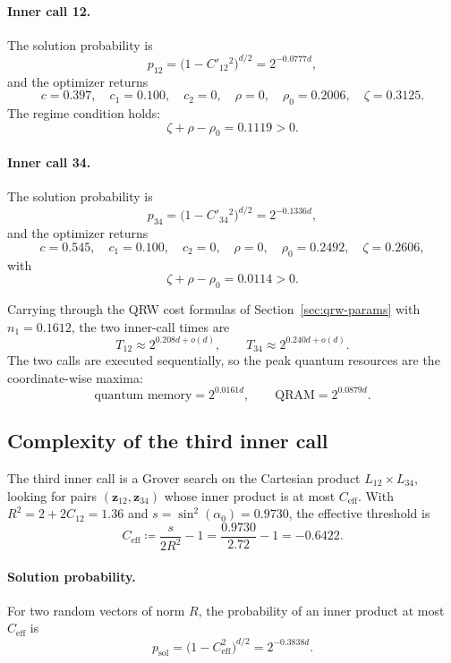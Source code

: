 \documentclass[10pt,a4paper]{article}
\begin{document}
\paragraph{Inner call 12.}
The solution probability is
\[
p_{12} = \bigl(1-C'_{12}{}^2\bigr)^{d/2} = 2^{-0.0777d},
\]
and the optimizer returns
\begin{equation}
c = 0.397,\quad c_1 = 0.100,\quad c_2 = 0,\quad \rho = 0,
\quad \rho_0 = 0.2006,\quad \zeta = 0.3125.
\end{equation}
The regime condition holds:
\[
\zeta + \rho - \rho_0 = 0.1119 > 0.
\]

\paragraph{Inner call 34.}
The solution probability is
\[
p_{34} = \bigl(1-C'_{34}{}^2\bigr)^{d/2} = 2^{-0.1336d},
\]
and the optimizer returns
\begin{equation}
c = 0.545,\quad c_1 = 0.100,\quad c_2 = 0,\quad \rho = 0,
\quad \rho_0 = 0.2492,\quad \zeta = 0.2606,
\end{equation}
with
\[
\zeta + \rho - \rho_0 = 0.0114 > 0.
\]

Carrying through the QRW cost formulas of Section~\ref{sec:qrw-params} with \(n_1 = 0.1612\), the two inner-call times are
\[
T_{12} \approx 2^{0.208d+o(d)},\qquad T_{34} \approx 2^{0.240d+o(d)}.
\]
The two calls are executed sequentially, so the peak quantum resources are the coordinate-wise maxima:
\[
\text{quantum memory} = 2^{0.0161d},\qquad
\text{QRAM} = 2^{0.0879d}.
\]

\subsection{Complexity of the third inner call}
\label{sec:third-call}

The third inner call is a Grover search on the Cartesian product
\(L_{12}\times L_{34}\), looking for pairs
\((\mathbf{z}_{12},\mathbf{z}_{34})\) whose inner product is at most
\(C_{\mathrm{eff}}\). With \(R^{2} = 2 + 2C_{12} = 1.36\) and
\(s = \sin^{2}(\alpha_0) = 0.9730\), the effective threshold is
\begin{equation}
C_{\mathrm{eff}} \coloneqq \frac{s}{2R^{2}}-1 = \frac{0.9730}{2.72}-1
= -0.6422.
\end{equation}

\paragraph{Solution probability.}
For two random vectors of norm \(R\), the probability of an inner product
at most \(C_{\mathrm{eff}}\) is
\[
p_{\mathrm{sol}} = \bigl(1-C_{\mathrm{eff}}^{2}\bigr)^{d/2} = 2^{-0.3838d}.
\]
\end{document}
